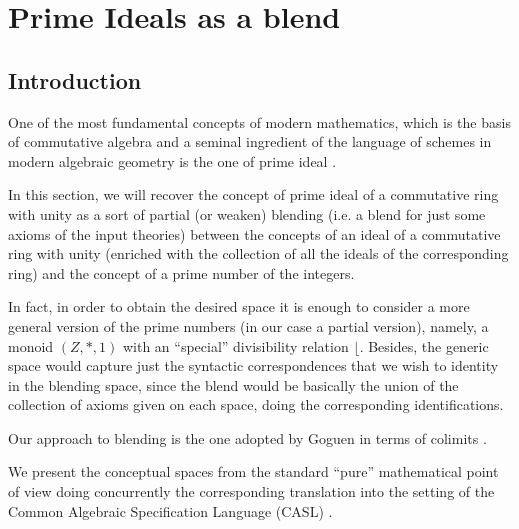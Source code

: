 \section{Prime Ideals as a blend}
\label{sec:prime_ideals}

\subsection*{Introduction}
One of the most fundamental concepts of modern mathematics, which is
the basis of commutative algebra and a seminal ingredient of the
language of schemes in modern algebraic geometry is the one of prime
ideal \parencite{EGAI,Eisenbud95}.

In this section, we will recover the concept of prime ideal of a
commutative ring with unity as a sort of partial (or weaken) blending
(i.e. a blend for just some axioms of the input theories) between the
concepts of an ideal of a commutative ring with unity (enriched with
the collection of all the ideals of the corresponding ring) and the
concept of a prime number of the integers.

In fact, in order to obtain the desired space it is enough to consider
a more general version of the prime numbers (in our case a partial
version), namely, a monoid $(Z,*,1)$ with an ``special'' divisibility
relation $\big\lfloor$. Besides, the generic space would capture just
the syntactic correspondences that we wish to identity in the
blending space, since the blend would be basically the union of the
collection of axioms given on each space, doing the corresponding
identifications.

Our approach to blending is the one adopted by Goguen in terms of
colimits \parencite{Gog99,Goguen01,Goguen05c}.

We present the conceptual spaces from the standard ``pure'' mathematical
point of view doing concurrently the corresponding translation into
the setting of the Common Algebraic Specification Language (CASL)
\parencite{BidoitMosses2004}.

